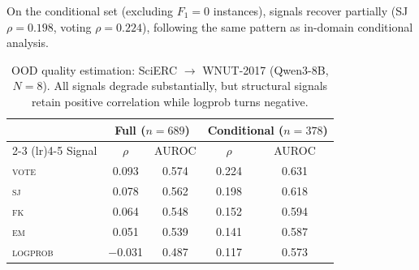 \documentclass[11pt]{article}
\begin{document}
On the conditional set (excluding $F_1{=}0$ instances), signals recover partially (SJ $\rho{=}0.198$, voting $\rho{=}0.224$), following the same pattern as in-domain conditional analysis.

\begin{table}[t]
\centering
\caption{OOD quality estimation: SciERC $\to$ WNUT-2017 (Qwen3-8B, $N{=}8$). All signals degrade substantially, but structural signals retain positive correlation while logprob turns negative.}
\label{tab:ood}
\small
\begin{tabular}{l cccc}
\toprule
& \multicolumn{2}{c}{Full ($n{=}689$)} & \multicolumn{2}{c}{Conditional ($n{=}378$)} \\
\cmidrule(lr){2-3} \cmidrule(lr){4-5}
Signal & $\rho$ & AUROC & $\rho$ & AUROC \\
\midrule
\textsc{vote}    & 0.093  & 0.574 & 0.224 & 0.631 \\
\textsc{sj}      & 0.078  & 0.562 & 0.198 & 0.618 \\
\textsc{fk}      & 0.064  & 0.548 & 0.152 & 0.594 \\
\textsc{em}      & 0.051  & 0.539 & 0.141 & 0.587 \\
\textsc{logprob} & $-$0.031 & 0.487 & 0.117 & 0.573 \\
\bottomrule
\end{tabular}
\end{table}
\end{document}

